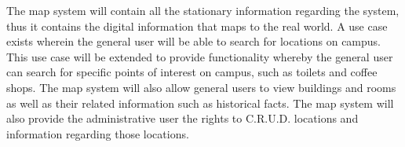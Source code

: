 {
	The map system will contain all the stationary information regarding the system, thus it contains the digital information that maps to the real world. A use case exists wherein the general user will be able to search for locations on campus. This use case will be extended to provide functionality whereby the general user can search for specific points of interest on campus, such as toilets and coffee shops. The map system will also allow general users to view buildings and rooms as well as their related information such as historical facts. The map system will also provide the administrative user the rights to C.R.U.D. locations and information regarding those locations.
}